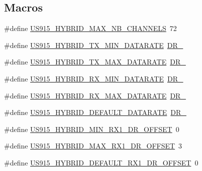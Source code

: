 \subsection*{Macros}
\begin{DoxyCompactItemize}
\item 
\#define \hyperlink{group__REGIONUS915HYB_ga977b73cbf7a5d15e2bf543fad5f35710}{U\+S915\+\_\+\+H\+Y\+B\+R\+I\+D\+\_\+\+M\+A\+X\+\_\+\+N\+B\+\_\+\+C\+H\+A\+N\+N\+E\+LS}~72
\item 
\#define \hyperlink{group__REGIONUS915HYB_ga6c7ab6789cb7bb1a5c1e22833905f787}{U\+S915\+\_\+\+H\+Y\+B\+R\+I\+D\+\_\+\+T\+X\+\_\+\+M\+I\+N\+\_\+\+D\+A\+T\+A\+R\+A\+TE}~\hyperlink{group__REGION_ga6c4ef966b4f3d5eb7597b087f2b97095}{D\+R\+\_}
\item 
\#define \hyperlink{group__REGIONUS915HYB_ga41872f6bb20d1dca0b778205ada36348}{U\+S915\+\_\+\+H\+Y\+B\+R\+I\+D\+\_\+\+T\+X\+\_\+\+M\+A\+X\+\_\+\+D\+A\+T\+A\+R\+A\+TE}~\hyperlink{group__REGION_ga6ceba6158a7dab238e9d0b846fb47a0c}{D\+R\+\_}
\item 
\#define \hyperlink{group__REGIONUS915HYB_gaf3c327837e52fbc665c3857f3731c5fe}{U\+S915\+\_\+\+H\+Y\+B\+R\+I\+D\+\_\+\+R\+X\+\_\+\+M\+I\+N\+\_\+\+D\+A\+T\+A\+R\+A\+TE}~\hyperlink{group__REGION_ga44cc96ba80ae464cd9330b784d329c16}{D\+R\+\_}
\item 
\#define \hyperlink{group__REGIONUS915HYB_ga10a143c061143776288b241e17c1b58d}{U\+S915\+\_\+\+H\+Y\+B\+R\+I\+D\+\_\+\+R\+X\+\_\+\+M\+A\+X\+\_\+\+D\+A\+T\+A\+R\+A\+TE}~\hyperlink{group__REGION_ga226f47470cc69a6fe831f7c92709bc1f}{D\+R\+\_}
\item 
\#define \hyperlink{group__REGIONUS915HYB_ga1ab202b7df1ef278c238dd8958ea0d8a}{U\+S915\+\_\+\+H\+Y\+B\+R\+I\+D\+\_\+\+D\+E\+F\+A\+U\+L\+T\+\_\+\+D\+A\+T\+A\+R\+A\+TE}~\hyperlink{group__REGION_ga6c4ef966b4f3d5eb7597b087f2b97095}{D\+R\+\_}
\item 
\#define \hyperlink{group__REGIONUS915HYB_ga526b61da154115ac916e9f217d50cd07}{U\+S915\+\_\+\+H\+Y\+B\+R\+I\+D\+\_\+\+M\+I\+N\+\_\+\+R\+X1\+\_\+\+D\+R\+\_\+\+O\+F\+F\+S\+ET}~0
\item 
\#define \hyperlink{group__REGIONUS915HYB_ga1e70e7e114c0fd6bf905085e78def426}{U\+S915\+\_\+\+H\+Y\+B\+R\+I\+D\+\_\+\+M\+A\+X\+\_\+\+R\+X1\+\_\+\+D\+R\+\_\+\+O\+F\+F\+S\+ET}~3
\item 
\#define \hyperlink{group__REGIONUS915HYB_ga314e35b76742b3b9ba602e5e2bbcba3f}{U\+S915\+\_\+\+H\+Y\+B\+R\+I\+D\+\_\+\+D\+E\+F\+A\+U\+L\+T\+\_\+\+R\+X1\+\_\+\+D\+R\+\_\+\+O\+F\+F\+S\+ET}~0
\item 

\end{DoxyCompactItemize}
